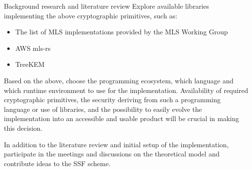 \documentclass[E]{BAMASA}
\begin{document}
\begin{workpackage}{Background research and literature review}
Explore available libraries implementing the above cryptographic primitives, such as:
\begin{itemize}
    \item The list of MLS implementations provided by the MLS Working Group~\cite{MLSWGimpl}
    \item AWS mls-rs~\cite{AWSMLSrs}
    \item TreeKEM~\cite{TreeKEMimpl}
\end{itemize}
Based on the above, choose the programming ecosystem, 
which language and which runtime environment to use for the implementation. 
Availability of required cryptographic primitives, 
the security deriving from such a programming language or use of libraries,
and the possibility to easily evolve the implementation into an accessible and usable product
will be crucial in making this decision.

In addition to the literature review and initial setup of the implementation, participate in the meetings and discussions on the theoretical model and contribute ideas to the SSF scheme.

\end{workpackage}
\end{document}
